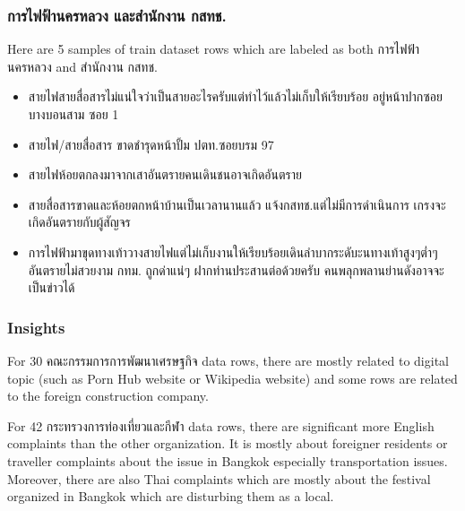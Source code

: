 \documentclass[12pt, a4paper]{article}
\begin{document}
    \pagebreak

                \subsubsection{การไฟฟ้านครหลวง \textbf{และสำนักงาน} \textbf{กสทช.}}
                    Here are 5 samples of train dataset rows which are labeled as both การไฟฟ้านครหลวง and สำนักงาน กสทช.
                    \begin{itemize}
                        \item สายไฟสายสื่อสารไม่แน่ใจว่าเป็นสายอะไรครับแต่ทำไว้แล้วไม่เก็บให้เรียบร้อย อยู่หน้าปากซอยบางบอนสาม ซอย 1
                        \item สายไฟ/สายสื่อสาร ขาดชำรุดหน้าปั้ม ปตท.ซอยบรม 97
                        \item สายไฟห้อยตกลงมาจากเสาอันตรายคนเดินชนอาจเกิดอันตราย
                        \item สายสื่อสารขาดและห้อยตกหน้าบ้านเป็นเวลานานแล้ว แจ้งกสทช.แต่ไม่มีการดำเนินการ เกรงจะเกิดอันตรายกับผู้สัญจร
                        \item การไฟฟ้ามาขุดทางเท้าวางสายไฟแต่ไม่เก็บงานให้เรียบร้อยเดินลำบากระดับะนทางเท้าสูงๆต่ำๆ อันตรายไม่สวยงาม กทม.
                        ถูกด่าแน่ๆ ฝากท่านประสานต่อด้วยครับ คนพลุกพลานย่านดังอาจจะเป็นข่าวได้
                    \end{itemize}

                \subsubsection{Insights}
                    For 30 คณะกรรมการการพัฒนาเศรษฐกิจ data rows, there are mostly related to digital topic
                    (such as Porn Hub website or Wikipedia website) and some rows are related to the
                    foreign construction company.

                    \vspace{0.5em}

                    For 42 กระทรวงการท่องเที่ยวและกีฬา data rows, there are significant more English complaints
                    than the other organization. It is mostly about foreigner residents or traveller
                    complaints about the issue in Bangkok especially transportation issues.
                    Moreover, there are also Thai complaints which are mostly about the festival organized
                    in Bangkok which are disturbing them as a local.
\end{document}
